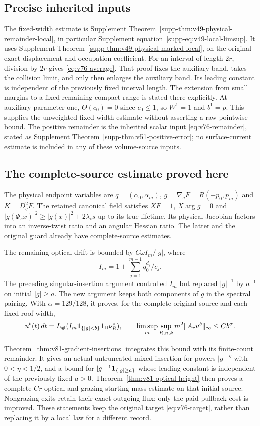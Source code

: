\documentclass[11pt,reqno]{amsart}
\numberwithin{equation}{section}
\theoremstyle{definition}\newtheorem{definition}[theorem]{Definition}
\theoremstyle{remark}\newtheorem{remark}[theorem]{Remark}
\theoremstyle{definition}\newtheorem{inputstatement}[theorem]{Input statement}
\begin{document}
\subsection{Precise inherited inputs}\label{sec:v79-input-map}
The fixed-width estimate is Supplement Theorem~\ref{supp-thm:v49-physical-remainder-local},
in particular Supplement equation~\eqref{supp-eq:v49-local-limsup}.
It uses Supplement Theorem~\ref{supp-thm:v49-physical-marked-local}, on the
original exact displacement and occupation coefficient. For an interval
of length $2r$, division by $2r$ gives \eqref{eq:v76-average}. That
proof fixes the auxiliary band, takes the collision limit, and only
then enlarges the auxiliary band. Its leading constant is independent
of the previously fixed interval length. The extension from small
margins to a fixed remaining compact range is stated there explicitly.
At auxiliary parameter one, $\Theta(c_0)=0$ since $c_0\le1$, so $W^1=1$
and $b^1=p$. This supplies the unweighted fixed-width estimate without
asserting a raw pointwise bound. The positive remainder is the inherited
scalar input \eqref{eq:v76-remainder}, stated as Supplement
Theorem~\ref{supp-thm:v51-positive-error}; no surface-current estimate is
included in any of these volume-source inputs.

\subsection{The complete-source estimate proved here}
The physical endpoint variables are
$q=(\alpha_0,\alpha_m)$, $g=\nabla_qF=R(-p_0,p_m)$ and
$K=D_q^2F$. The retained canonical field satisfies $XF=1$,
$X\arg g=0$ and
$|g(\Phi_sx)|^2\ge |g(x)|^2+2\lambda_\circ s$ up to its true
lifetime. Its physical Jacobian factors into an inverse-twist ratio
and an angular Hessian ratio. The latter and the original guard
already have complete-source estimates.

The remaining optical drift is bounded by
$C\omega I_m/|g|$, where
\[
 I_m=1+\sum_{j=1}^{m-1}q_0^{d_j}/c_j.
\]
The preceding singular-insertion argument controlled $I_m$ but
replaced $|g|^{-1}$ by $a^{-1}$ on initial $|g|\ge a$.
The new argument keeps both components of $g$ in the spectral
pairing. With $\alpha=129/128$, it proves, for the complete original
source and each fixed roof width,
\[
 u^b(t)\,dt=L_\#(I_m\mathbf1_{\{|g|<b\}}\mathbf1_\Pi\nu_R^*),\qquad
 \limsup_m\sup_{R,n,k}m^2\|A_ru^b\|_\infty\le Cb^\alpha.
\]

Theorem~\ref{thm:v81-gradient-insertions} integrates this bound with
its finite-count remainder. It gives an actual untruncated mixed
insertion for powers $|g|^{-\eta}$ with $0<\eta<1/2$, and a bound
for $|g|^{-1}\mathbf1_{\{|g|\ge a\}}$ whose leading constant is
independent of the previously fixed $a>0$.
Theorem~\ref{thm:v81-optical-height} then proves a complete
$Cr$ optical and grazing starting-mass estimate on that initial
source. Nongrazing exits retain their exact outgoing flux; only
the paid pullback cost is improved. These statements keep the
original target \eqref{eq:v76-target}, rather than replacing it by
a local law for a different record.
\end{document}
